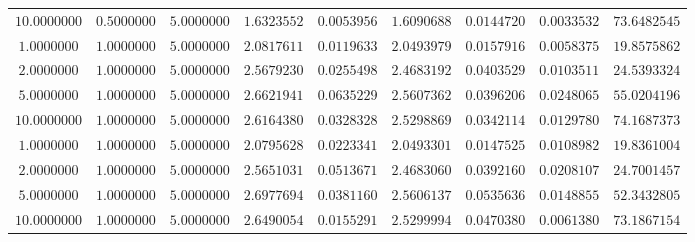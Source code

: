 \begin{tabular}{ccccccccc}
$10.0000000$ & $0.5000000$ & $5.0000000$ & $1.6323552$ & $0.0053956$ & $1.6090688$ & $0.0144720$ & $0.0033532$ & $73.6482545$\\
$1.0000000$ & $1.0000000$ & $5.0000000$ & $2.0817611$ & $0.0119633$ & $2.0493979$ & $0.0157916$ & $0.0058375$ & $19.8575862$\\
$2.0000000$ & $1.0000000$ & $5.0000000$ & $2.5679230$ & $0.0255498$ & $2.4683192$ & $0.0403529$ & $0.0103511$ & $24.5393324$\\
$5.0000000$ & $1.0000000$ & $5.0000000$ & $2.6621941$ & $0.0635229$ & $2.5607362$ & $0.0396206$ & $0.0248065$ & $55.0204196$\\
$10.0000000$ & $1.0000000$ & $5.0000000$ & $2.6164380$ & $0.0328328$ & $2.5298869$ & $0.0342114$ & $0.0129780$ & $74.1687373$\\
$1.0000000$ & $1.0000000$ & $5.0000000$ & $2.0795628$ & $0.0223341$ & $2.0493301$ & $0.0147525$ & $0.0108982$ & $19.8361004$\\
$2.0000000$ & $1.0000000$ & $5.0000000$ & $2.5651031$ & $0.0513671$ & $2.4683060$ & $0.0392160$ & $0.0208107$ & $24.7001457$\\
$5.0000000$ & $1.0000000$ & $5.0000000$ & $2.6977694$ & $0.0381160$ & $2.5606137$ & $0.0535636$ & $0.0148855$ & $52.3432805$\\
$10.0000000$ & $1.0000000$ & $5.0000000$ & $2.6490054$ & $0.0155291$ & $2.5299994$ & $0.0470380$ & $0.0061380$ & $73.1867154$\\
\end{tabular}
